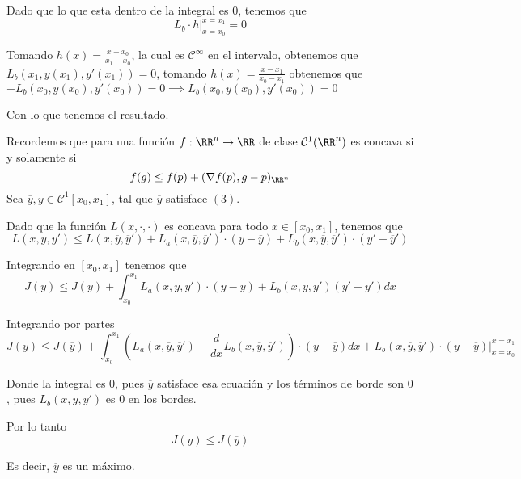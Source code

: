 \documentclass[a4paper,oneside,10.5pt]{USMArt}
\begin{document}
\begin{sol}
  Dado que lo que esta dentro de la integral es $0$, tenemos que
  \begin{equation*}
    L_{b} \cdot h|_{x = x_{0}}^{x = x_{1}} = 0
  \end{equation*}

  Tomando $h(x) = \frac{x - x_{0}}{x_{1} - x_{0}}$, la cual es $\mathcal{C}^{\infty}$ en el intervalo, obtenemos
  que $L_{b}(x_{1}, y(x_{1}), y'(x_{1})) = 0$, tomando
  $h(x) = \frac{x - x_{1}}{x_{0} - x_{1}}$ obtenemos que $-L_{b}(x_{0}, y(x_{0}), y'(x_{0})) = 0 \implies L_{b}(x_{0}, y(x_{0}), y'(x_{0})) = 0$

  Con lo que tenemos el resultado.
\end{sol}

\begin{sol}
  Recordemos que para una función $f : \RR^{n} \to \RR$ de clase $\mathcal{C}^{1}(\RR^{n})$ es concava si y solamente
  si
  \begin{equation*}
    f(g) \leq f(p) + (\nabla f(p), g - p)_{\RR^{n}}
  \end{equation*}
  Sea $\overline{y}, y \in \mathcal{C}^{1}[x_{0}, x_{1}]$, tal que $\overline{y}$ satisface
  $(3)$.

  Dado que la función $L(x, \cdot, \cdot)$ es concava para todo $x \in [x_{0}, x_{1}]$, tenemos que
  \begin{equation*}
    L(x, y, y') \leq L(x, \overline{y}, \overline{y}') + L_{a}(x, \overline{y}, \overline{y}') \cdot (y - \overline{y}) + L_{b}(x, \overline{y}, \overline{y}') \cdot (y' - \overline{y}')
  \end{equation*}

  Integrando en $[x_{0}, x_{1}]$ tenemos que
  \begin{equation*}
    J(y) \leq J(\overline{y}) + \int_{x_{0}}^{x_{1}} L_{a}(x, \overline{y}, \overline{y}') \cdot (y - \overline{y}) + L_{b}(x, \overline{y}, \overline{y}') (y' - \overline{y}') dx
  \end{equation*}

  Integrando por partes
  \begin{equation*}
     J(y) \leq J(\overline{y}) + \int_{x_{0}}^{x_{1}} (L_{a}(x, \overline{y}, \overline{y}') - \frac{d}{dx} L_{b}(x, \overline{y}, \overline{y}')) \cdot (y - \overline{y}) dx + L_{b}(x, \overline{y}, \overline{y}') \cdot (y - \overline{y})|^{x = x_{1}}_{x = x_{0}}
  \end{equation*}

  Donde la integral es $0$, pues $\overline{y}$ satisface esa ecuación y los términos de borde son $0$, pues $L_{b}(x, \overline{y}, \overline{y}')$ es $0$ en los bordes.

  Por lo tanto
  \begin{equation*}
    J(y) \leq J(\overline{y})
  \end{equation*}

  Es decir, $\overline{y}$ es un máximo.
\end{sol}
\end{document}
